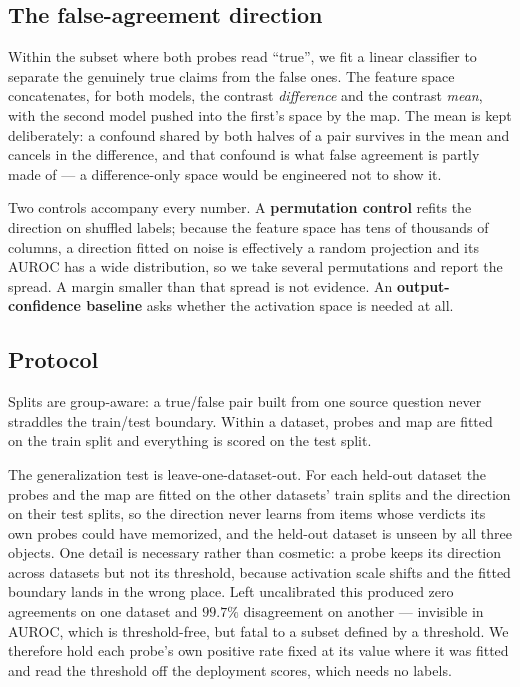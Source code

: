 \subsection{The false-agreement direction}
\label{sec:method:direction}

Within the subset where both probes read ``true'', we fit a linear classifier to
separate the genuinely true claims from the false ones. The feature space
concatenates, for both models, the contrast \emph{difference} and the contrast
\emph{mean}, with the second model pushed into the first's space by the map. The
mean is kept deliberately: a confound shared by both halves of a pair survives in
the mean and cancels in the difference, and that confound is what false agreement
is partly made of --- a difference-only space would be engineered not to show it.

Two controls accompany every number. A \textbf{permutation control} refits the
direction on shuffled labels; because the feature space has tens of thousands of
columns, a direction fitted on noise is effectively a random projection and its
AUROC has a wide distribution, so we take several permutations and report the
spread. A margin smaller than that spread is not evidence. An
\textbf{output-confidence baseline} asks whether the activation space is needed
at all.

\subsection{Protocol}
\label{sec:method:protocol}

Splits are group-aware: a true/false pair built from one source question never
straddles the train/test boundary. Within a dataset, probes and map are fitted on
the train split and everything is scored on the test split.

The generalization test is leave-one-dataset-out. For each held-out dataset the
probes and the map are fitted on the other datasets' train splits and the
direction on their test splits, so the direction never learns from items whose
verdicts its own probes could have memorized, and the held-out dataset is unseen
by all three objects. One detail is necessary rather than cosmetic: a probe keeps
its direction across datasets but not its threshold, because activation scale
shifts and the fitted boundary lands in the wrong place. Left uncalibrated this
produced zero agreements on one dataset and $99.7\%$ disagreement on another ---
invisible in AUROC, which is threshold-free, but fatal to a subset defined by a
threshold. We therefore hold each probe's own positive rate fixed at its value
where it was fitted and read the threshold off the deployment scores, which needs
no labels.

